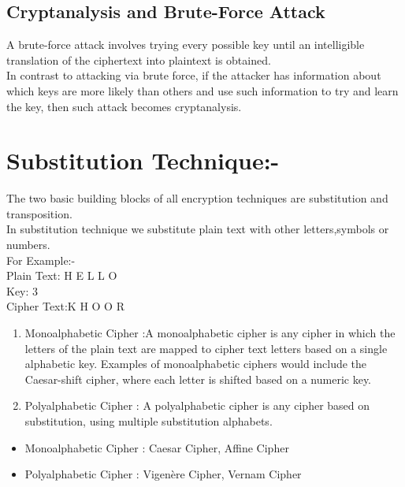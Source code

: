 \documentclass{article}
\begin{document}
\subsection{Cryptanalysis and Brute-Force Attack}
A brute-force attack involves trying every possible key until an intelligible translation of the ciphertext into plaintext is obtained.\\
In contrast to attacking via brute force, if the attacker has information about which keys are more likely than others and use such information to try and learn the key, then such attack becomes cryptanalysis.
\section{Substitution Technique:-}
The two basic building blocks of all encryption techniques are substitution and transposition.\\
In substitution technique we substitute plain text with other letters,symbols or numbers.\\
For Example:-\\
Plain Text: H E L L O\\
Key: 3\\
Cipher Text:K H O O R\\
\begin{enumerate}
    \item Monoalphabetic Cipher :A monoalphabetic cipher is any cipher in which the letters of the plain text are mapped to cipher text letters based on a single alphabetic key. Examples of monoalphabetic ciphers would include the Caesar-shift cipher, where each letter is shifted based on a numeric key.
    \item Polyalphabetic Cipher : A polyalphabetic cipher is any cipher based on substitution, using multiple substitution alphabets.
\end{enumerate}
\begin{itemize}
    \item Monoalphabetic Cipher : Caesar Cipher, Affine Cipher
    \item Polyalphabetic Cipher : Vigenère Cipher, Vernam Cipher
\end{itemize}
\end{document}
